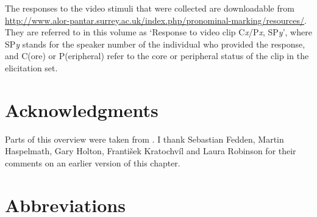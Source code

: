 The responses to the video stimuli that were collected are downloadable from \url{http://www.alor-pantar.surrey.ac.uk/index.php/pronominal-marking/resources/}. They are referred to in this volume as `Response to video clip C\textit{x}/P\textit{x}, SP\textit{y}', where SP\textit{y} stands for the speaker number of the individual who provided the response, and C(ore) or P(eripheral) refer to the core or peripheral status of the clip in the elicitation set. 

\section*{Acknowledgments}
Parts of this overview were taken from \citet{Klamer2010grammar,Klamer2011,BairdEtAlMs,HoltontoappearNusantara}. I thank Sebastian Fedden, Martin Haspelmath, Gary Holton, Franti\v{s}ek Kratochv\'il and Laura Robinson for their comments on an earlier version of this chapter.

\section*{Abbreviations}


